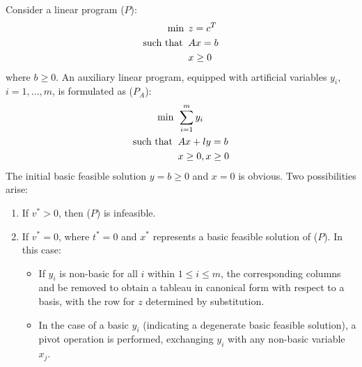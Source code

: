 Consider a linear program ($P$): 
\begin{align*}
    \min                      \:&\:z=c^T            \\
    \textnormal{such that }     &\: Ax=b            \\
                                &\: x \geq 0
\end{align*}
where $b \geq 0$. 
An auxiliary linear program, equipped with artificial variables $y_i$, $i=1,\dots,m$, is formulated as ($P_A$): 
\begin{align*}
    \min                      \:&\: \sum_{i=1}^{m}y_i               \\
    \textnormal{such that }     &\: Ax+ly=b                         \\
                                &\: x \geq 0, x \geq 0
\end{align*}
The initial basic feasible solution $y=b \geq 0$ and $x=0$ is obvious. 
Two possibilities arise:
\begin{enumerate}
    \item If $v^{*}>0$, then ($P$) is infeasible.
    \item If $v^{*}=0$, where $t^{*}=0$ and $x^{*}$ represents a basic feasible solution of ($P$). 
        In this case: 
        \begin{itemize}
            \item If $y_i$ is non-basic for all $i$ within $1 \leq i \leq m$, the corresponding columns and be removed to obtain a tableau in canonical form with respect to a basis, with the row for $z$ determined by substitution.
            \item In the case of a basic $y_i$ (indicating a degenerate basic feasible solution), a pivot operation is performed, exchanging $y_i$ with any non-basic variable $x_j$.
        \end{itemize}
\end{enumerate}
